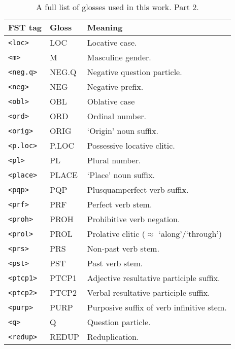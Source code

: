 \begin{table}[!h]
    \begin{center}
        \caption{A full list of glosses used in this work. Part 2.}
        \label{Tab:glosses_2}
        \begin{tabular}{|p{4cm}|p{3cm}|p{8.5cm}|}
            \hline
            \textbf{FST tag} & \textbf{Gloss} & \textbf{Meaning} \\
            \hline
            \hline
            \texttt{<loc>} & LOC & Locative case.\\
            \texttt{<m>} & M & Masculine gender.\\
            \texttt{<neg.q>} & NEG.Q & Negative question particle.\\
            \texttt{<neg>} & NEG & Negative prefix.\\
            \texttt{<obl>} & OBL & Oblative case\\
            \texttt{<ord>} & ORD & Ordinal number.\\
            \texttt{<orig>} & ORIG & `Origin' noun suffix. \\
            \texttt{<p.loc>} & P.LOC & Possessive locative clitic. \\
            \texttt{<pl>} & PL & Plural number.\\
            \texttt{<place>} & PLACE & `Place' noun suffix.\\
            \texttt{<pqp>} & PQP & Plusquamperfect verb suffix.\\
            \texttt{<prf>} & PRF & Perfect verb stem.\\
            \texttt{<proh>} & PROH & Prohibitive verb negation.\\
            \texttt{<prol>} & PROL & Prolative clitic ($\approx$ `along'/`through')\\
            \texttt{<prs>} & PRS & Non-past verb stem.\\
            \texttt{<pst>} & PST & Past verb stem.\\
            \texttt{<ptcp1>} & PTCP1 & Adjective resultative participle suffix.\\
            \texttt{<ptcp2>} & PTCP2 & Verbal resultative participle suffix.\\
            \texttt{<purp>} & PURP & Purposive suffix of verb infinitive stem.\\
            \texttt{<q>} & Q & Question particle.\\
            \texttt{<redup>} & REDUP & Reduplication. \\

\end{tabular}
\end{center}
\end{table}
